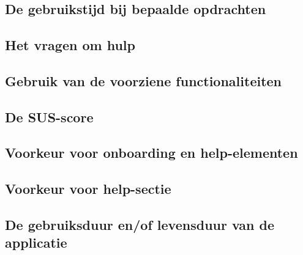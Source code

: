 \chapter{}
\label{ch:metingen}

\section{De gebruikstijd bij bepaalde opdrachten}
\label{sec:gebruikstijd}

\section{Het vragen om hulp}
\label{sec:vragen-hulp}

\section{Gebruik van de voorziene functionaliteiten}
\label{sec:gebruik-functionaliteiten}

\section{De SUS-score}
\label{sec:sus}

\section{Voorkeur voor onboarding en help-elementen}
\label{sec:voorkeur-onboarding}

\section{Voorkeur voor help-sectie}
\label{sec:voorkeur-help}

\section{De gebruiksduur en/of levensduur van de applicatie}
\label{sec:gebruiksduur}

